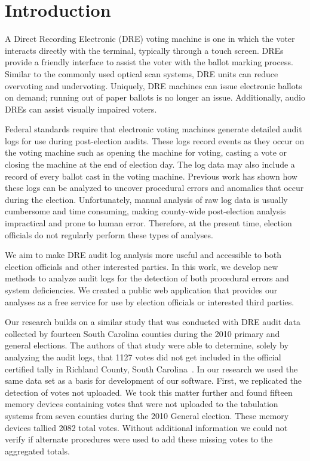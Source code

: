 \bigvertspace
\section{Introduction}
\smvertspace
A Direct Recording Electronic (DRE) voting machine is one in which the 
voter interacts directly with the terminal, typically through a touch
screen. DREs provide a friendly interface to assist the voter with the
ballot marking process. Similar to the commonly used optical scan
systems, DRE units can reduce overvoting and undervoting. Uniquely,
DRE machines can issue electronic ballots on demand; running out of
paper ballots is no longer an issue. Additionally, audio DREs can
assist visually impaired voters.
 
Federal standards require that electronic voting machines generate
detailed audit logs for use during post-election
audits. These logs record events as they occur on the voting machine 
such as opening the machine for voting, casting a vote or closing the
machine at the end of election day. The log data may also include a
record of every ballot cast in the voting machine.  Previous work has
shown how these logs can be analyzed to uncover procedural errors and
anomalies that occur during the election\cite{Buell2011}.
Unfortunately, manual analysis of raw log data is usually cumbersome
and time consuming, making county-wide post-election analysis
impractical and prone to human error. Therefore, at the present time,
election officials do not regularly perform these types of analyses. 

We aim to make DRE audit log analysis more useful and accessible to
both election officials and other interested parties. In this work, we
develop new methods to analyze audit logs for the detection of
both procedural errors and system deficiencies. We created a public
web application that provides our analyses as a free service for use by election
officials or interested third parties.
 
Our research builds on a similar study that was conducted with DRE audit data
collected by fourteen South Carolina counties during the 2010 primary and
general elections.  The authors of that study were able to determine, solely by
analyzing the audit logs, that 1127 votes did not get included in the official
certified tally in Richland County, South Carolina~\cite{Buell2011}. In our
research we used the same 
data set as a basis for development of our software. First, we replicated the
detection of votes not uploaded. We took this matter further and found fifteen
memory devices containing votes that were not uploaded to the tabulation systems
from seven counties during the 2010 General election. These memory devices
tallied 2082 total votes. Without additional information we could not verify if
alternate procedures were used to add these missing votes to the aggregated
totals. 

